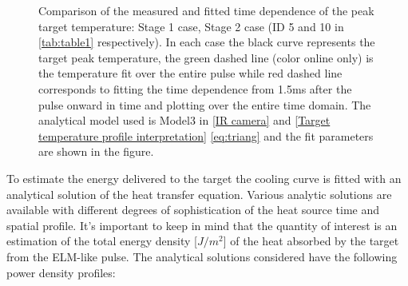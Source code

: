 \begin{figure}
\begin{subfigure}{0.45\linewidth}
         \vspace{-20mm}
         \caption{\phantom{wewwwwwwwwwww}}
         \label{fig:IR1b}
     \end{subfigure}
        \caption{Comparison of the measured and fitted time dependence of the peak target temperature:  Stage 1 case,   Stage 2 case (ID 5 and 10 in \autoref{tab:table1} respectively). In each case the black curve represents the target peak temperature, the green dashed line (color online only) is the temperature fit over the entire pulse while red dashed line corresponds to fitting the time dependence from 1.5ms after the pulse onward in time and plotting over the entire time domain. The analytical model used is Model3 in \autoref{IR camera} and \autoref{Target temperature profile interpretation} \autoref{eq:triang} and the fit parameters are shown in the figure.}
        \label{fig:IR1}
\end{figure}

To estimate the energy delivered to the target the cooling curve is fitted with an analytical solution of the heat transfer equation. Various analytic solutions are available with different degrees of sophistication of the heat source time and spatial profile. It’s important to keep in mind that the quantity of interest is an estimation of the total energy density [$J/m^2$] of the heat absorbed by the target from the ELM-like pulse. The analytical solutions considered have the following power density profiles:

